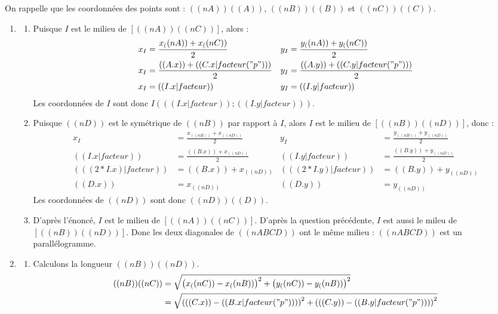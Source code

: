 \exercice*

On rappelle que les coordonnées des points sont : $((nA))((A))$, $((nB))((B))$ et $((nC))((C))$.
\begin{enumerate}
  \item
\begin{enumerate}
    \item Puisque $I$ est le milieu de $[((nA))((nC))]$, alors :
    \begin{align*}
        x_I &= \frac{x_((nA))+x_((nC))}{2} & y_I &= \frac{y_((nA))+y_((nC))}{2}\\
      x_I &= \frac{((A.x)) + ((C.x|facteur("p")))}{2} & y_I &= \frac{((A.y))+((C.y|facteur("p")))}{2}\\
      x_I &= ((I.x|facteur)) & y_I &= ((I.y|facteur))\\
    \end{align*}
    Les coordonnées de $I$ sont donc $I( ((I.x|facteur)); ((I.y|facteur)) )$.
\item Puisque $((nD))$ est le symétrique de $((nB))$ par rapport à $I$, alors $I$ est le milieu de $[((nB))((nD))]$, donc :
    \begin{align*}
        x_I &= \frac{x_((nB))+x_((nD))}{2} & y_I &= \frac{y_((nB))+y_((nD))}{2}\\
        ((I.x|facteur)) &= \frac{((B.x))+x_((nD))}{2} & ((I.y|facteur)) &= \frac{((B.y))+y_((nD))}{2}\\
        (((2*I.x)|facteur)) &= ((B.x))+x_((nD)) & (((2*I.y)|facteur)) &= ((B.y))+y_((nD))\\
        ((D.x)) &= x_((nD)) & ((D.y))&=y_((nD))
    \end{align*}
    Les coordonnées de $((nD))$ sont donc $((nD))((D))$.
\item D'après l'énoncé, $I$ est le milieu de $[((nA))((nC))]$. D'après la question précédente, $I$ est aussi le mileu de $[((nB))((nD))]$. Donc les deux diagonales de $((nABCD))$ ont le même milieu : $((nABCD))$ est un parallélogramme.
\end{enumerate}
\item
\begin{enumerate}
    \item Calculons la longueur $((nB))((nD))$.
    \begin{align*}
        ((nB))((nC)) &= \sqrt{\left( x_((nC))-x_((nB)) \right)^2+\left( y_((nC))-y_((nB)) \right)^2}\\
      &= \sqrt{\left( ((C.x))-((B.x|facteur("p"))) \right)^2+\left( ((C.y))-((B.y|facteur("p"))) \right)^2}\\

\end{align*}
\end{enumerate}
\end{enumerate}
